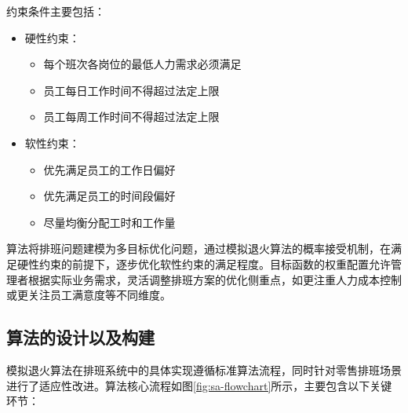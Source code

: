 \documentclass{ctexart}
\begin{document}
约束条件主要包括：
\begin{itemize}
    \item 硬性约束：
    \begin{itemize}
        \item 每个班次各岗位的最低人力需求必须满足
        \item 员工每日工作时间不得超过法定上限
        \item 员工每周工作时间不得超过法定上限
    \end{itemize}
    \item 软性约束：
    \begin{itemize}
        \item 优先满足员工的工作日偏好
        \item 优先满足员工的时间段偏好
        \item 尽量均衡分配工时和工作量
    \end{itemize}
\end{itemize}

算法将排班问题建模为多目标优化问题，通过模拟退火算法的概率接受机制，在满足硬性约束的前提下，逐步优化软性约束的满足程度。目标函数的权重配置允许管理者根据实际业务需求，灵活调整排班方案的优化侧重点，如更注重人力成本控制或更关注员工满意度等不同维度。

\subsection{算法的设计以及构建}
模拟退火算法在排班系统中的具体实现遵循标准算法流程，同时针对零售排班场景进行了适应性改进。算法核心流程如图\ref{fig:sa-flowchart}所示，主要包含以下关键环节：

\end{document}
